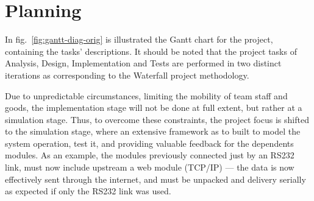 \section{Planning}%
\label{sec:orga82318d}
In fig.~\ref{fig:gantt-diag-orig} is illustrated the Gantt chart for the project, containing the tasks' descriptions. It should be noted
that the project tasks of Analysis, Design, Implementation and Tests are
performed in two distinct iterations as corresponding to the Waterfall project
methodology.

Due to unpredictable circumstances, limiting the mobility of team
staff and goods, the implementation stage will not be done at full extent, but
rather at a simulation stage. Thus, to overcome these constraints, the project
focus is shifted to the simulation stage, where an extensive framework as to
built to model the system operation, test it, and providing valuable feedback
for the dependents modules. As an example, the modules previously connected just
by an RS232 link, must now include upstream a web module (TCP/IP) --- the data
is now effectively sent through the internet, and must be unpacked and delivery
serially as expected if only the RS232 link was used.

